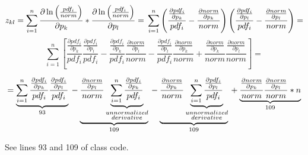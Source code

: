 \documentclass[a4paper,10pt]{article}
\begin{document}
$$z_{kl} = \sum_{i=1}^n \frac{\partial \ln \left( \frac{pdf_i}{norm} \right)}{\partial p_k} * \frac{\partial \ln \left( \frac{pdf_i}{norm}\right)}{\partial p_l} = \\
\sum_{i=1}^n \left( \frac{\frac{\partial pdf_i}{\partial p_k}}{pdf_i} - \frac{\frac{\partial norm}{\partial p_k}}{norm}\right) \left( \frac{\frac{\partial pdf_i}{\partial p_l}}{pdf_i} - \frac{\frac{\partial norm}{\partial p_l}}{norm}\right) = $$
$$\sum_{i=1}^n \left[\frac{\frac{\partial pdf_i}{\partial p_k}}{pdf_i} \frac{\frac{\partial pdf_i}{\partial p_l}}{pdf_i} - \frac{\frac{\partial pdf_i}{\partial p_k}}{pdf_i} \frac{\frac{\partial norm}{\partial p_l}}{norm}   -  \frac{\frac{\partial pdf_i}{\partial p_l}}{pdf_i} \frac{\frac{\partial norm}{\partial p_k}}{norm} +  \frac{\frac{\partial norm}{\partial p_k}}{norm} \frac{\frac{\partial norm}{\partial p_l}}{norm} \right] = $$

$$ = \underbrace{\sum_{i=1}^n \frac{\frac{\partial pdf_i}{\partial p_k}}{pdf_i} \frac{\frac{\partial pdf_i}{\partial p_l}}{pdf_i}}_{93} \\
- \underbrace{\frac{\frac{\partial norm}{\partial p_l}}{norm}  \underbrace{\sum_{i=1}^n \frac{\frac{\partial pdf_i}{\partial p_k}}{pdf_i}}_{\substack{unnormalized\\derivative}}}_{109} \\
- \underbrace{\frac{\frac{\partial norm}{\partial p_k}}{norm}  \underbrace{\sum_{i=1}^n \frac{\frac{\partial pdf_i}{\partial p_l}}{pdf_i}}_{\substack{unnormalized\\derivative}}}_{109} \\
+ \underbrace{\frac{\frac{\partial norm}{\partial p_k}}{norm} \frac{\frac{\partial norm}{\partial p_l}}{norm}*n}_{109} $$

See lines 93 and 109 of class code.
\end{document}
